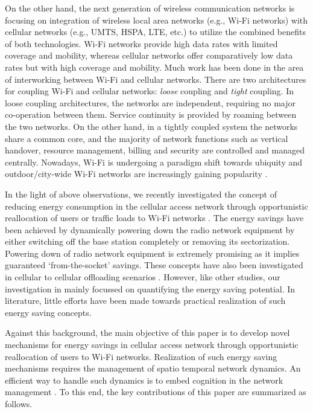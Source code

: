\documentclass[journal]{IEEEtran}
\begin{document}
On the other hand, the next generation of wireless communication networks is focusing on integration of wireless local area networks (e.g., Wi-Fi networks) with cellular networks (e.g., UMTS, HSPA, LTE, etc.) to utilize the combined benefits of both
technologies. Wi-Fi networks provide high data rates with limited coverage and mobility, whereas cellular networks offer comparatively low data rates but with high coverage and mobility. Much work has been done in the area of interworking between Wi-Fi and cellular networks.  There are two architectures for coupling Wi-Fi and cellular networks: \emph{loose} coupling and \emph{tight} coupling. In loose coupling architectures, the networks are independent, requiring no major co-operation between them. Service continuity is provided by roaming between the two networks. On the other hand, in a tightly coupled system the networks share a common core, and the majority of network functions such as vertical handover, resource management, billing and security are controlled and managed centrally. Nowadays, Wi-Fi is undergoing a paradigm shift towards ubiquity and outdoor/city-wide Wi-Fi networks are increasingly gaining popularity \cite{aijaz_wcm}.

In the light of above observations, we recently investigated the concept of reducing energy consumption in the cellular access network through opportunistic reallocation of users or traffic loads to Wi-Fi networks \cite{aijaz_icc_12}. The energy savings have been achieved by dynamically powering down the radio network equipment by either switching off the base station completely or removing its sectorization. Powering down of radio network equipment is extremely promising as it implies guaranteed `from-the-socket' savings. These concepts have also been investigated  in cellular to cellular offloading scenarios \cite{oliver_commag, pimrc_13, aijaz_crc}. However, like other studies, our investigation in \cite{aijaz_icc_12} mainly focussed on quantifying the energy saving potential. In literature, little efforts have been made towards practical realization of such energy saving concepts. 

Against this background, the main objective of this paper is to develop novel mechanisms for energy savings in cellular access network  through opportunistic reallocation of users to Wi-Fi networks. Realization of such energy saving mechanisms requires the management of spatio temporal network dynamics. An efficient way to handle such dynamics is to embed cognition in the network management \cite{cognition}. To this end, the key contributions of this paper are summarized as follows.
\end{document}
